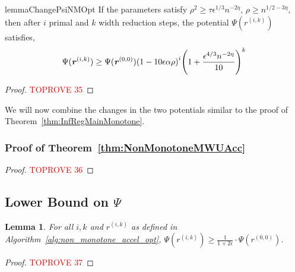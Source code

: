 \documentclass[11pt]{article}
\newtheorem{lemma}[theorem]{Lemma}
\let\originalleft\left
\let\originalright\right
\renewcommand{\left}{\mathopen{}\mathclose\bgroup\originalleft}
\renewcommand{\right}{\aftergroup\egroup\originalright}
\newcommand\rr{\boldsymbol{\mathit{r}}}
\begin{document}
\begin{restatable}{lemma}{ChangePsiNMOpt}
\label{lem:ChangePsiNMOpt}
If the parameters satisfy $\rho^2 \geq \tau \epsilon^{1/3} n^{-2\eta}$, $\rho\geq n^{1/2-3\eta}$, then after $i$ primal and $k$ width reduction steps, the potential $\Psi(\rr^{(i,k)})$ satisfies,
\[
\Psi(\rr^{(i,k)})\geq \Psi(\rr^{(0,0)})\left(1-10\epsilon\alpha\rho\right)^i\left(1+\frac{\epsilon^{4/3}n^{-2\eta}}{10}\right)^k
\]
\end{restatable}
\begin{proof}\textcolor{red}{TOPROVE 35}\end{proof}

We will now combine the changes in the two potentials similar to the proof of Theorem~\ref{thm:InfRegMainMonotone}.
\subsubsection*{Proof of Theorem~\ref{thm:NonMonotoneMWUAcc}}
\begin{proof}\textcolor{red}{TOPROVE 36}\end{proof}



 




\subsection*{Lower Bound on \texorpdfstring{$\Psi$}{}}

\begin{lemma}\label{lem:lower_bound_Psi}
    For all $i,k$ and $\rr^{(i,k)}$ as defined in Algorithm~\ref{alg:non_monotone_accel_opt}, $\Psi(\rr^{(i,k)})\geq \frac{1}{1+2\epsilon}\cdot\Psi(\rr^{(0,0)})$.
\end{lemma}
\begin{proof}\textcolor{red}{TOPROVE 37}\end{proof} 

\newpage
\clearpage
\end{document}
